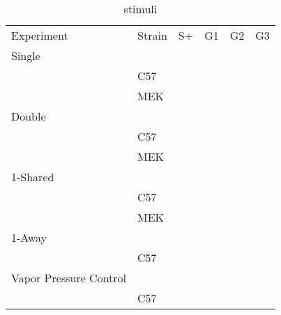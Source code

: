 \begin{table}
\caption{stimuli}
\label{table:stimuli}
\begin{tabular}{l | l | l | l | l | l |}
Experiment & Strain & S+ & G1 & G2 & G3 \\
Single & & & & & \\
& C57 & & & & \\
& MEK & & & & \\
Double & & & & & \\
& C57 & & & & \\
& MEK & & & & \\
1-Shared & & & & & \\
& C57 & & & & \\ 
& MEK & & & & \\ 
1-Away & & & & & \\ 
& C57 & & & & \\ 
Vapor Pressure Control & & & & & \\ 
& C57 & & & & \\ 
\end{tabular}
\end{table}
